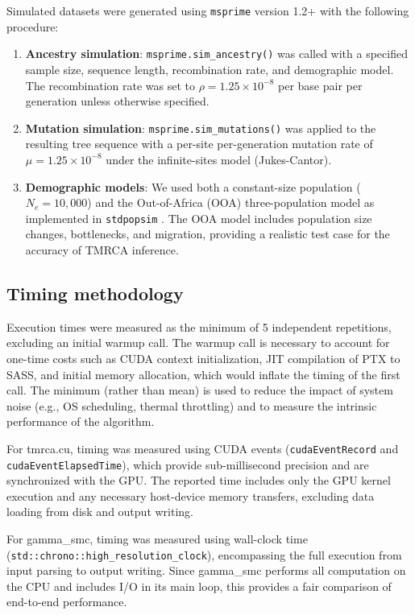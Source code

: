 \documentclass[10pt,letterpaper]{article}
\begin{document}
Simulated datasets were generated using \texttt{msprime} version 1.2+ \citep{Baumdicker2022} with the following procedure:
\begin{enumerate}
\item \textbf{Ancestry simulation}: \texttt{msprime.sim\_ancestry()} was called with a specified sample size, sequence length, recombination rate, and demographic model. The recombination rate was set to $\rho = 1.25 \times 10^{-8}$ per base pair per generation unless otherwise specified.
\item \textbf{Mutation simulation}: \texttt{msprime.sim\_mutations()} was applied to the resulting tree sequence with a per-site per-generation mutation rate of $\mu = 1.25 \times 10^{-8}$ under the infinite-sites model (Jukes-Cantor).
\item \textbf{Demographic models}: We used both a constant-size population ($N_e = 10{,}000$) and the \citet{Gutenkunst2009} Out-of-Africa (OOA) three-population model as implemented in \texttt{stdpopsim} \citep{Adrion2020}. The OOA model includes population size changes, bottlenecks, and migration, providing a realistic test case for the accuracy of TMRCA inference.
\end{enumerate}

\subsection{Timing methodology}

Execution times were measured as the minimum of 5 independent repetitions, excluding an initial warmup call. The warmup call is necessary to account for one-time costs such as CUDA context initialization, JIT compilation of PTX to SASS, and initial memory allocation, which would inflate the timing of the first call. The minimum (rather than mean) is used to reduce the impact of system noise (e.g., OS scheduling, thermal throttling) and to measure the intrinsic performance of the algorithm.

For tmrca.cu, timing was measured using CUDA events (\texttt{cudaEventRecord} and \texttt{cudaEventElapsedTime}), which provide sub-millisecond precision and are synchronized with the GPU. The reported time includes only the GPU kernel execution and any necessary host-device memory transfers, excluding data loading from disk and output writing.

For gamma\_smc, timing was measured using wall-clock time (\texttt{std::chrono::high\_resolution\_clock}), encompassing the full execution from input parsing to output writing. Since gamma\_smc performs all computation on the CPU and includes I/O in its main loop, this provides a fair comparison of end-to-end performance.
\end{document}
